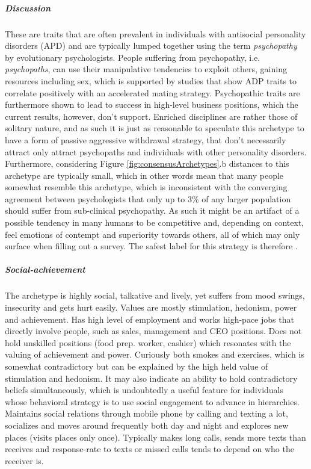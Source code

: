 	\subparagraph{\textnormal{\textit{Discussion}}} 
	These are traits that are often prevalent in individuals with antisocial personality disorders (APD) and are typically lumped together using the term \textit{psychopathy} by evolutionary psychologists.
	People suffering from psychopathy, i.e. \textit{psychopaths}, can use their manipulative tendencies to exploit others, gaining resources including sex, which is supported by studies that show ADP traits to correlate positively with an accelerated mating strategy.
	Psychopathic traits are furthermore shown to lead to success in high-level business positions, which the current results, however, don't support.
	Enriched disciplines are rather those of solitary nature, and as such it is just as reasonable to speculate this archetype to have a form of passive aggressive withdrawal strategy, that don't necessarily attract only attract psychopaths and individuals with other personality disorders.
	Furthermore, considering Figure \ref{fig:consensusArchetypes}.b distances to this archetype are typically small, which in other words mean that many people somewhat resemble this archetype, which is inconsistent with the converging agreement between psychologists that only up to 3\% of any larger population should suffer from sub-clinical psychopathy.
	As such it might be an artifact of a possible tendency in many humans to be competitive and, depending on context, feel emotions of contempt and superiority towards others, all of which may only surface when filling out a survey.
	The safest label for this strategy is therefore \achiever.

\subparagraph*{Social-achievement}
The \host archetype is highly social, talkative and lively, yet suffers from mood swings, insecurity and gets hurt easily.
Values are mostly stimulation, hedonism, power and achievement.
Has high level of employment and works high-pace jobs that directly involve people, such as sales, management and CEO positions.
Does not hold unskilled positions (food prep. worker, cashier) which resonates with the valuing of achievement and power.
Curiously both smokes and exercises, which is somewhat contradictory but can be explained by the high held value of stimulation and hedonism.
It may also indicate an ability to hold contradictory beliefs simultaneously, which is undoubtedly a useful feature for individuals whose behavioral strategy is to use social engagement to advance in hierarchies.
Maintains social relations through mobile phone by calling and texting a lot, socializes and moves around frequently both day and night and explores new places (visits places only once).
Typically makes long calls, sends more texts than receives and response-rate to texts or missed calls tends to depend on who the receiver is.

